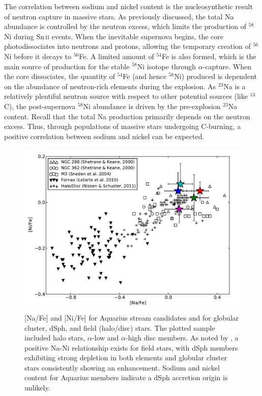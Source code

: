 \documentclass{emulateapj}
\begin{document}
The correlation between sodium and nickel content is the nucleosynthetic result of neutron capture in massive stars. As previously discussed, the total Na abundance is controlled by the neutron excess, which limits the production of $^{58}$Ni during {Sn\,\textsc{ii}} events. When the inevitable supernova begins, the core photodissociates into neutrons and protons, allowing the temporary creation of $^{56}$Ni before it decays to $^{56}$Fe. A limited amount of $^{54}$Fe is also formed, which is the main source of production for the stable $^{58}$Ni isotope through $\alpha$-capture. When the core dissociates, the quantity of $^{54}$Fe (and hence $^{58}$Ni) produced is dependent on the abundance of neutron-rich elements during the explosion. As $^{23}$Na is a relatively plentiful neutron source with respect to other potential sources (like $^{13}$C), the post-supernova $^{58}$Ni abundance is driven by the pre-explosion $^{23}$Na content. Recall that the total Na production primarily depends on the neutron excess. Thus, through populations of massive stars undergoing C-burning, a positive correlation between sodium and nickel can be expected. 


\begin{figure}[h!]
	\includegraphics[width=\columnwidth]{./figures/gc-dsph-na-ni.pdf}
	\caption{[Na/Fe] and [Ni/Fe] for Aquarius stream candidates and for globular cluster, dSph, and field (halo/disc) stars. The \citet{nissen;schuster_2011} plotted sample included halo stars, $\alpha$-low and $\alpha$-high disc members. As noted by \citet{nissen;schuster_1997,nissen;schuster_2011}, a positive Na-Ni relationship exists for field stars, with dSph members exhibiting strong depletion in both elements and globular cluster stars consistently showing an enhancement. Sodium and nickel content for Aquarius members indicate a dSph accretion origin is unlikely.}
	\label{fig:na-ni}
\end{figure}
\end{document}
